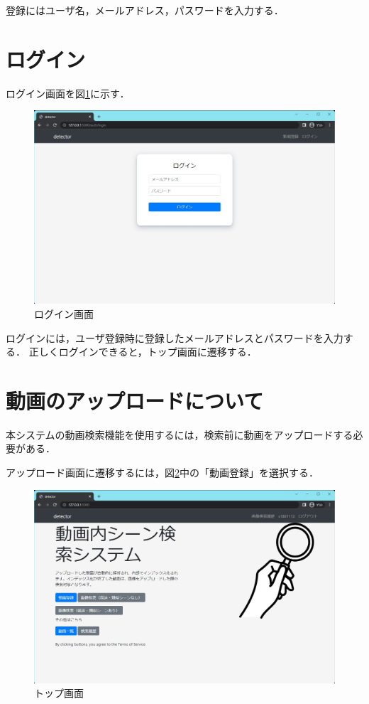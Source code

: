 \documentclass[a4j,12pt,dvipdfmx]{jreport}
\begin{document}
登録にはユーザ名，メールアドレス，パスワードを入力する．

\section{ログイン}
ログイン画面を図\ref{fig:user_login}に示す．

\begin{figure}[H]
  \centering
  \includegraphics[width=13cm]{image/user_login.jpg}
  \caption{ログイン画面}
  \label{fig:user_login}
\end{figure}

ログインには，ユーザ登録時に登録したメールアドレスとパスワードを入力する．
正しくログインできると，トップ画面に遷移する．

\section{動画のアップロードについて}
本システムの動画検索機能を使用するには，検索前に動画をアップロードする必要がある．

アップロード画面に遷移するには，図\ref{fig:index}中の「動画登録」を選択する．

\begin{figure}[H]
  \centering
  \includegraphics[width=13cm]{image/index.jpg}
  \caption{トップ画面}
  \label{fig:index}
\end{figure}
\end{document}

